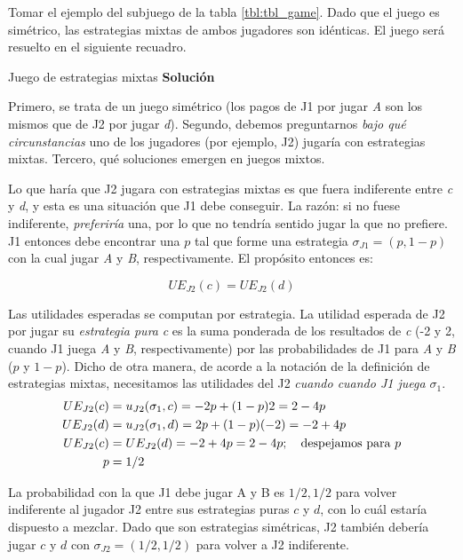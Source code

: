 \documentclass[12pt]{scrartcl}
\theoremstyle{definition}
\begin{document}
Tomar el ejemplo del subjuego de la tabla \ref{tbl:tbl_game}. Dado que el juego es simétrico, las estrategias mixtas de ambos jugadores son idénticas. El juego será resuelto en el siguiente recuadro.


\begin{exbox}{Juego de estrategias mixtas}
    \textbf{Solución}
    
    Primero, se trata de un juego simétrico (los pagos de J1 por jugar \textit{A} son los mismos que de J2 por jugar \textit{d}). Segundo, debemos preguntarnos\textit{ bajo qué circunstancias} uno de los jugadores (por ejemplo, J2) jugaría con estrategias mixtas. Tercero, qué soluciones emergen en juegos mixtos.
    
    Lo que haría que J2 jugara con estrategias mixtas es que fuera indiferente entre \textit{c} y \textit{d}, y esta es una situación que J1 debe conseguir. La razón: si no fuese indiferente, \textit{preferiría} una, por lo que no tendría sentido jugar la que no prefiere. J1 entonces debe encontrar una $p$ tal que forme una estrategia $\sigma_{J1} = (p, 1-p)$ con la cual jugar \textit{A} y \textit{B}, respectivamente. El propósito entonces es:
    
    \[ UE_{J2}(c) = UE_{J2}(d) \]
    
    Las utilidades esperadas se computan por estrategia. La utilidad esperada de J2 por jugar su \textit{estrategia pura} \textit{c} es la suma ponderada de los resultados de \textit{c} (-2 y 2, cuando J1 juega \textit{A} y \textit{B}, respectivamente) por las probabilidades de J1 para \textit{A} y \textit{B} ($p$ y $1-p$). Dicho de otra manera, de acorde a la notación de la definición de estrategias mixtas, necesitamos las utilidades del J2 \textit{cuando cuando J1 juega $\sigma_1$}.
    \begin{align*}
    \vspace{-1cm}
        UE_{J2}(c) &= u_{J2}(\sigma_1, c) = -2p + (1-p)2    = 2 -4p\\
        UE_{J2}(d) &= u_{J2}(\sigma_1, d) =  2p  + (1-p)(-2) = -2 + 4p\\
        UE_{J2}(c) &= UE_{J2}(d) = -2 + 4p = 2 -4p;\quad \text{despejamos para } p\\
         p &= 1/2
    \end{align*}
    
    La probabilidad con la que J1 debe jugar A y B es $1/2, 1/2$ para volver indiferente al jugador J2 entre sus estrategias puras $c$ y $d$, con lo cuál estaría dispuesto a mezclar. Dado que son estrategias simétricas, J2 también debería jugar $c$ y $d$ con $\sigma_{J2}=(1/2, 1/2)$ para volver a J2 indiferente. 
\end{exbox}
\end{document}
